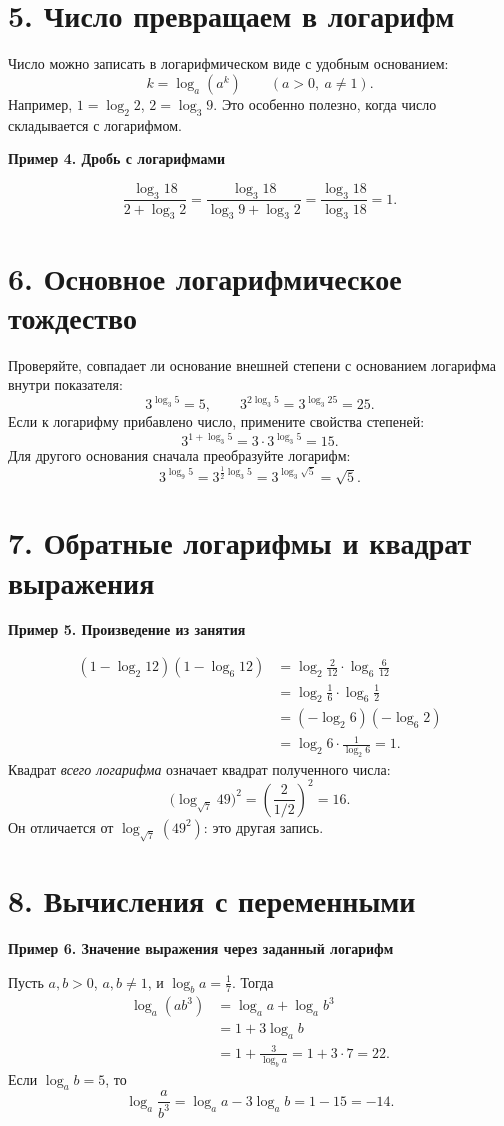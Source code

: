 \documentclass[a4paper,11pt]{article}
\newcommand{\namedexample}[1]{\par\medskip\textbf{#1}\par\vspace{-2mm}}
\begin{document}
\section*{5. Число превращаем в логарифм}
Число можно записать в логарифмическом виде с удобным основанием:
\[
\boxed{k=\log_a(a^k)}\qquad(a>0,\ a\ne1).
\]
Например, \(1=\log_2 2\), \(2=\log_3 9\). Это особенно полезно, когда число складывается с логарифмом.
\namedexample{Пример 4. Дробь с логарифмами}
\[
\frac{\log_3 18}{2+\log_3 2}
=\frac{\log_3 18}{\log_3 9+\log_3 2}
=\frac{\log_3 18}{\log_3 18}
=\boxed{1}.
\]

\section*{6. Основное логарифмическое тождество}
Проверяйте, совпадает ли основание внешней степени с основанием логарифма внутри показателя:
\[
3^{\log_3 5}=5,\qquad
3^{2\log_3 5}=3^{\log_3 25}=25.
\]
Если к логарифму прибавлено число, примените свойства степеней:
\[
3^{1+\log_3 5}=3\cdot3^{\log_3 5}=\boxed{15}.
\]
Для другого основания сначала преобразуйте логарифм:
\[
3^{\log_9 5}=3^{\frac12\log_3 5}
=3^{\log_3\sqrt5}=\boxed{\sqrt5}.
\]

\section*{7. Обратные логарифмы и квадрат выражения}
\namedexample{Пример 5. Произведение из занятия}
\[
\begin{aligned}
(1-\log_2 12)(1-\log_6 12)
&=\log_2\frac2{12}\cdot\log_6\frac6{12}\\
&=\log_2\frac16\cdot\log_6\frac12\\
&=(-\log_2 6)(-\log_6 2)\\
&=\log_2 6\cdot\frac1{\log_2 6}=\boxed{1}.
\end{aligned}
\]
Квадрат \emph{всего логарифма} означает квадрат полученного числа:
\[
\bigl(\log_{\sqrt7}49\bigr)^2
=\left(\frac2{1/2}\right)^2=\boxed{16}.
\]
Он отличается от \(\log_{\sqrt7}(49^2)\): это другая запись.

\section*{8. Вычисления с переменными}
\namedexample{Пример 6. Значение выражения через заданный логарифм}
Пусть \(a,b>0\), \(a,b\ne1\), и \(\log_b a=\frac17\). Тогда
\[
\begin{aligned}
\log_a(ab^3)
&=\log_a a+\log_a b^3\\
&=1+3\log_a b\\
&=1+\frac3{\log_b a}=1+3\cdot7=\boxed{22}.
\end{aligned}
\]
Если \(\log_a b=5\), то
\[
\log_a\frac a{b^3}=\log_a a-3\log_a b=1-15=\boxed{-14}.
\]
\end{document}
